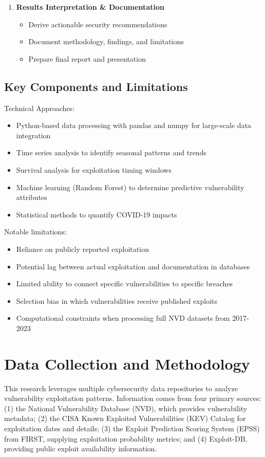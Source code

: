 \documentclass[runningheads]{llncs}
\begin{document}
\begin{enumerate}
    \item \textbf{Results Interpretation \& Documentation}
    \begin{itemize}
        \item Derive actionable security recommendations
        \item Document methodology, findings, and limitations
        \item Prepare final report and presentation
    \end{itemize}
\end{enumerate}

\subsection{Key Components and Limitations}
Technical Approaches:
\begin{itemize}
    \item Python-based data processing with pandas and numpy for large-scale data integration
    \item Time series analysis to identify seasonal patterns and trends
    \item Survival analysis for exploitation timing windows
    \item Machine learning (Random Forest) to determine predictive vulnerability attributes
    \item Statistical methods to quantify COVID-19 impacts
\end{itemize}

Notable limitations:
\begin{itemize}
    \item Reliance on publicly reported exploitation
    \item Potential lag between actual exploitation and documentation in databases
    \item Limited ability to connect specific vulnerabilities to specific breaches
    \item Selection bias in which vulnerabilities receive published exploits
    \item Computational constraints when processing full NVD datasets from 2017-2023
\end{itemize}

\section{Data Collection and Methodology}
This research leverages multiple cybersecurity data repositories to analyze vulnerability exploitation patterns. Information comes from four primary sources: (1) the National Vulnerability Database (NVD), which provides vulnerability metadata; (2) the CISA Known Exploited Vulnerabilities (KEV) Catalog for exploitation dates and details; (3) the Exploit Prediction Scoring System (EPSS) from FIRST, supplying exploitation probability metrics; and (4) Exploit-DB, providing public exploit availability information.
\end{document}
